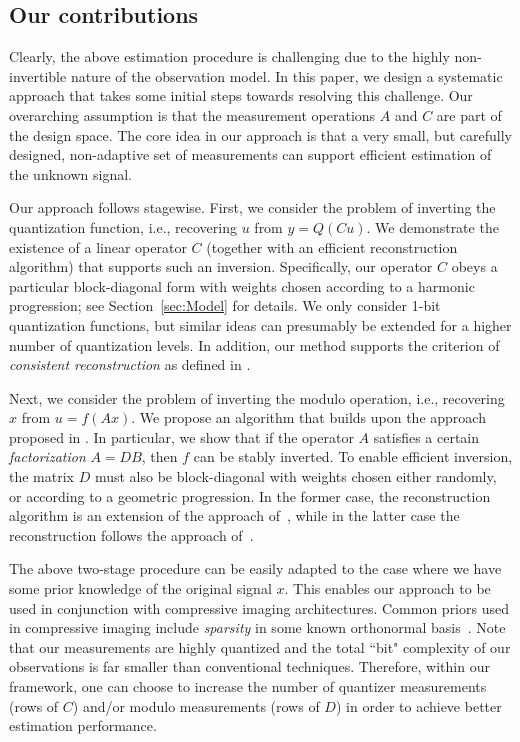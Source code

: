 \subsection{Our contributions}

Clearly, the above estimation procedure is challenging due to the highly non-invertible nature of the observation model. In this paper, we design a systematic approach that takes some initial steps towards resolving this challenge. Our overarching assumption is that the measurement operations $A$ and $C$ are part of the design space. The core idea in our approach is that a very small, but carefully designed, non-adaptive set of measurements can support efficient estimation of the unknown signal.

Our approach follows stagewise. First, we consider the problem of inverting the quantization function, i.e., recovering $u$ from $y = Q(Cu)$. We demonstrate the existence of a linear operator $C$ (together with an efficient reconstruction algorithm) that supports such an inversion. Specifically, our operator $C$ obeys a particular block-diagonal form with weights chosen according to a harmonic progression; see Section~\ref{sec:Model} for details. We only consider 1-bit quantization functions, but similar ideas can presumably be extended for a higher number of quantization levels. In addition, our method supports the criterion of \emph{consistent reconstruction} as defined in \cite{jacques2011dequantizing}.

Next, we consider the problem of inverting the modulo operation, i.e., recovering $x$ from $u = f(Ax)$.  We propose an algorithm that builds upon the approach proposed in \cite{SoltaniHegde_ICASSP16}. In particular, we show that if the operator $A$ satisfies a certain \emph{factorization} $A = DB$, then $f$ can be stably inverted. To enable efficient inversion, the matrix $D$ must also be block-diagonal with weights chosen either randomly, or according to a geometric progression. In the former case, the reconstruction algorithm is an extension of the approach of~\cite{SoltaniHegde_ICASSP16}, while in the latter case the reconstruction follows the approach of~\cite{ICCP15_Zhao}.

The above two-stage procedure can be easily adapted to the case where we have some prior knowledge of the original signal $x$. This enables our approach to be used in conjunction with compressive imaging architectures. Common priors used in compressive imaging include \emph{sparsity} in some known orthonormal basis~\cite{foucart2013}. Note that our measurements are highly quantized and the total ``bit" complexity of our observations is far smaller than conventional techniques. Therefore, within our framework, one can choose to increase the number of quantizer measurements (rows of $C$) and/or modulo measurements (rows of $D$) in order to achieve better estimation performance.


